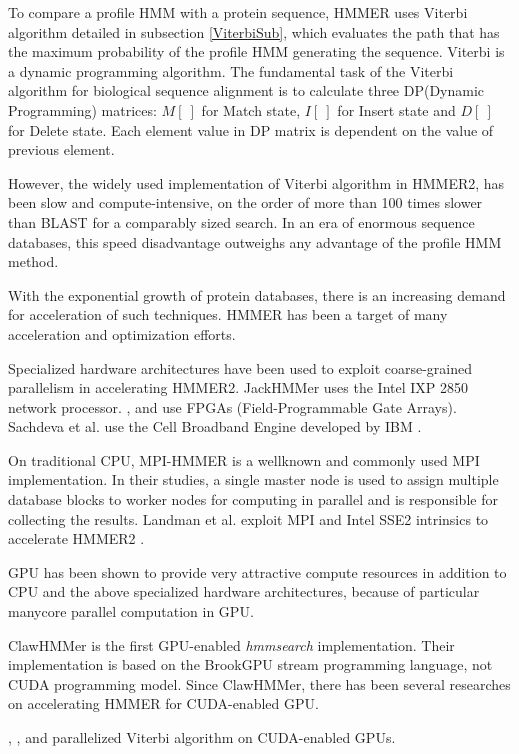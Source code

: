 To compare a profile HMM with a protein sequence, HMMER uses Viterbi algorithm detailed in subsection \ref{ViterbiSub}, which evaluates the path that has the maximum probability of the profile HMM generating the sequence. Viterbi is a dynamic programming algorithm.
The fundamental task of the Viterbi algorithm for biological sequence alignment is to calculate three DP(Dynamic Programming) matrices: $M[~]$ for Match state, $I[~]$ for Insert state and $D[~]$ for Delete state. Each element value in DP matrix is dependent on the value of previous element.

However, the widely used implementation of Viterbi algorithm in HMMER2, has been slow and compute-intensive, on the order of more than 100 times slower than BLAST for a comparably sized search. In an era of enormous sequence databases, this speed disadvantage outweighs any advantage of the profile HMM method.

With the exponential growth of protein databases, there is an increasing demand for acceleration of such techniques. HMMER has been a target of many acceleration and optimization efforts. 

Specialized hardware architectures have been used to exploit coarse-grained parallelism in accelerating HMMER2. JackHMMer \citep{Wun} uses the Intel IXP 2850 network processor. \citep{Maddimsetty}, \citep{Derrien} and \citep{Oliver} use FPGAs (Field-Programmable Gate Arrays). Sachdeva et al. use the Cell Broadband Engine developed by IBM \citep{Sachdeva}.

On traditional CPU, MPI-HMMER \citep{Walters2006} is a wellknown and commonly used MPI implementation. In their studies, a single master node is used to assign multiple database blocks to worker nodes for computing in parallel and is responsible for collecting the results. Landman et al. exploit MPI and Intel SSE2 intrinsics to accelerate HMMER2 \citep{Landman}.

GPU has been shown to provide very attractive compute resources in addition to CPU and the above specialized hardware architectures, because of particular manycore parallel computation in GPU.

ClawHMMer \citep{ClawHMMER} is the first GPU-enabled \emph{hmmsearch} implementation. Their implementation is based on the BrookGPU stream programming language, not CUDA programming model. Since ClawHMMer, there has been several researches on accelerating HMMER for CUDA-enabled GPU.

\citep{GPUHMM}, \citep{Ganesan}, \citep{Du} and \citep{Quirem} parallelized Viterbi algorithm on CUDA-enabled GPUs.


